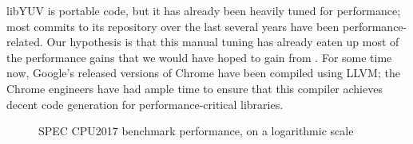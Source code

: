 libYUV is portable code, but it has already been heavily tuned for
performance; most commits to its repository over the last several
years have been performance-related.
%
Our hypothesis is that this manual tuning has already eaten up most of
the performance gains that we would have hoped to gain from \minotaur{}.
%
For some time now, Google's released versions of Chrome have been
compiled using LLVM; the Chrome engineers have had ample time to
ensure that this compiler achieves decent code generation for
performance-critical libraries.


\begin{figure}[tbp]
  \centering
  \hfill
  \caption{SPEC CPU2017 benchmark performance, on a logarithmic scale}
  \label{fig:spec}
\end{figure}

